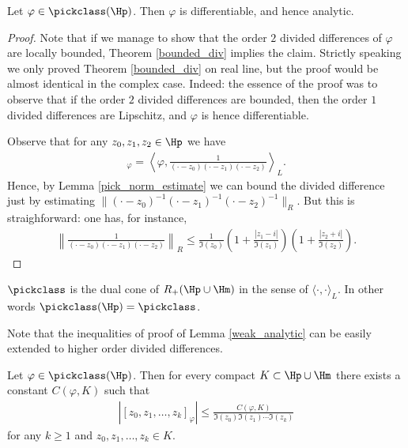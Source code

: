 \begin{lem}\label{weak_analytic}
	Let $\varphi \in \pickclass(\Hp)$. Then $\varphi$ is differentiable, and hence analytic.
\end{lem}
\begin{proof}
	Note that if we manage to show that the order $2$ divided differences of $\varphi$ are locally bounded, Theorem \ref{bounded_div} implies the claim. Strictly speaking we only proved Theorem \ref{bounded_div} on real line, but the proof would be almost identical in the complex case. Indeed: the essence of the proof was to observe that if the order $2$ divided differences are bounded, then the order $1$ divided differences are Lipschitz, and $\varphi$ is hence differentiable.

	Observe that for any $z_{0}, z_{1}, z_{2} \in \Hp$ we have
	\begin{align*}
		[z_{0}, z_{1}, z_{2}]_{\varphi} = \left\langle \varphi, \frac{1}{(\cdot - z_{0}) (\cdot - z_{1}) (\cdot - z_{2})}\right\rangle_{L}.
	\end{align*}
	Hence, by Lemma \ref{pick_norm_estimate} we can bound the divided difference just by estimating $\|(\cdot - z_{0})^{-1} (\cdot - z_{1})^{-1} (\cdot - z_{2})^{-1}\|_{R}$. But this is straighforward: one has, for instance,
	\begin{align*}
		\left\|\frac{1}{(\cdot - z_{0}) (\cdot - z_{1}) (\cdot - z_{2})}\right\|_{R} \leq \frac{1}{\Im(z_{0})} \left(1 + \frac{|z_{1} - i|}{\Im(z_{1})}\right) \left(1 + \frac{|z_{2} + i|}{\Im(z_{2})}\right).
	\end{align*}
\end{proof}

\begin{kor}\label{pick_predual_ans}
	$\pickclass$ is the dual cone of $R_{+}(\Hp \cup \Hm)$ in the sense of $\langle \cdot, \cdot \rangle_{L}$. In other words $\pickclass(\Hp) = \pickclass$.
\end{kor}

Note that the inequalities of proof of Lemma \ref{weak_analytic} can be easily extended to higher order divided differences.

\begin{prop}\label{pick_div_dif_estimate}
	Let $\varphi \in \pickclass(\Hp)$. Then for every compact $K \subset \Hp \cup \Hm$ there exists a constant $C(\varphi, K)$ such that
	\begin{align*}
		\left|[z_{0}, z_{1}, \ldots, z_{k}]_{\varphi}\right| \leq \frac{C(\varphi, K)}{\Im(z_{0}) \Im(z_{1}) \cdots \Im(z_{k})}
	\end{align*}
	for any $k \geq 1$ and $z_{0}, z_{1}, \ldots, z_{k} \in K$.
\end{prop}

